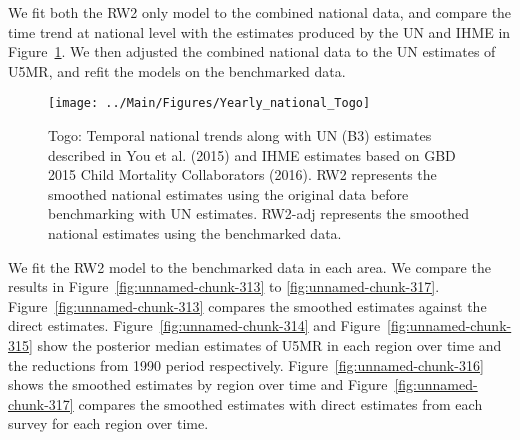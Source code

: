 \documentclass[12pt]{article}\usepackage[]{graphicx}\usepackage[]{color}
\newenvironment{knitrout}{}{} %
\begin{document}
We fit both the RW2 only model to the combined national data, and compare the time trend at national level with the estimates produced by the UN and IHME in Figure~\ref{fig:unnamed-chunk-312}. We then adjusted the combined national data to the UN estimates of U5MR, and refit the models on the benchmarked data. 

\begin{knitrout}
\color{fgcolor}\begin{figure}[bht]

{\centering \texttt{[image: ../Main/Figures/Yearly\_national\_Togo]} 

}

\caption[Togo]{Togo: Temporal national trends along with UN (B3) estimates described in You et al. (2015) and IHME estimates based on GBD 2015 Child Mortality Collaborators (2016). RW2 represents the smoothed national estimates using the original data before benchmarking with UN estimates. RW2-adj represents the smoothed national estimates using the benchmarked data.}\label{fig:unnamed-chunk-312}
\end{figure}


\end{knitrout}
 

We fit the RW2 model to the benchmarked data in each area. 
We compare the results in Figure~\ref{fig:unnamed-chunk-313} to \ref{fig:unnamed-chunk-317}.
Figure~\ref{fig:unnamed-chunk-313} compares the smoothed estimates against the direct estimates. Figure~\ref{fig:unnamed-chunk-314} and Figure~\ref{fig:unnamed-chunk-315} show the posterior median estimates of U5MR in each region over time and the reductions from 1990 period respectively.
Figure~\ref{fig:unnamed-chunk-316} shows the smoothed estimates by region over time and Figure~\ref{fig:unnamed-chunk-317} compares the smoothed estimates with direct estimates from each survey for each region over time.




\end{document}
